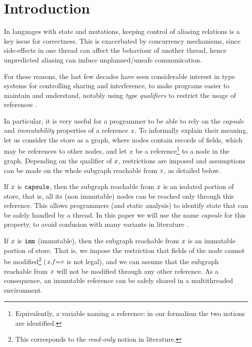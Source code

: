 \section{Introduction}
In languages with state and  mutations,  keeping control of aliasing relations is a key issue for correctness. This is  {exacerbated} by  concurrency mechanisms, since side-effects in one thread can affect the behaviour of another thread, hence unpredicted aliasing can induce unplanned/unsafe communication.

For these reasons, the last few decades have seen considerable interest in type systems for controlling sharing and interference, to make programs easier to maintain and understand, notably using \emph{type qualifiers} to restrict the usage of references \cite{ZibinEtAl10,GordonEtAl12,NadenEtAl12,ClebschEtAl15}. 

{In particular, it is very useful for a programmer to be able to rely on the \emph{capsule} and \emph{immutability} properties of a reference $\mathit{x}$. To informally explain their meaning, let us consider the store as a graph, where nodes contain records of fields, which may be
references to other nodes, and let $\mathit{x}$ be a reference\footnote{{Equivalently, a variable naming a reference: in our formalism the two notions are identified.}} to a node in the graph.
Depending on the qualifier of $\mathit{x}$,  restrictions are imposed {and} assumptions can be made on the whole subgraph reachable from $\mathit{x}$, as detailed below. }

{If $\mathit{x}$ is $\texttt{capsule}$, then the subgraph reachable from 
$\mathit{x}$ is an isolated portion of store, that is, all its (non immutable) nodes
can be reached only through this reference. This allows programmers (and static analysis)
to identify state that can be safely handled by a thread.  In this paper we will use the name \emph{capsule} for this property, to avoid confusion with many variants in literature \cite{ClarkeWrigstad03,Almeida97,ServettoEtAl13a,Hogg91,DietlEtAl07,GordonEtAl12}.}

{If $\mathit{x}$ is $\texttt{imm}$ (immutable), then the subgraph reachable from 
$\mathit{x}$ is an immutable portion of store. That is, we impose the restriction that fields of the node cannot be modified\footnote{This corresponds to the \emph{read-only} notion in literature.} ($\mathit{x}.\mathit{f}{=}\mathit{e}$ is not legal), and we can assume that the subgraph reachable from $\mathit{x}$ will 
not be modified through any other reference. As a consequence, an immutable reference can be safely shared
in a multithreaded environment.}

